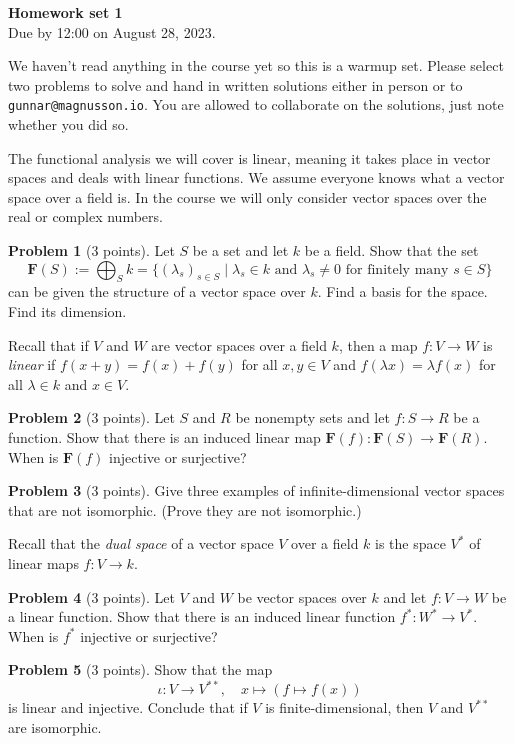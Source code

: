 \documentclass[11pt]{article}
\theoremstyle{definition}
\newtheorem{prob}{Problem}
\newcommand{\kk}[1]{\mathbf{#1}}
\def\head{
\begin{center}
\textbf{\LARGE Homework set 1}
\\[3pt]
Due by 12:00 on August 28, 2023.
\end{center}
\medskip
}
\begin{document}
\head

We haven't read anything in the course yet so this is a warmup set.
Please select two problems to solve and hand in written solutions either in person or to \verb+gunnar@magnusson.io+.
You are allowed to collaborate on the solutions, just note whether you did so.

The functional analysis we will cover is linear, meaning it takes place
in vector spaces and deals with linear functions.
We assume everyone knows what a vector space over a field is.
In the course we will only consider vector spaces over the real or complex numbers.


\begin{prob}[3 points]
Let $S$ be a set and let $k$ be a field.
Show that the set
\[
\kk F(S) :=
\bigoplus_{S} k
= \{ (\lambda_s)_{s \in S} \mid
\text{$\lambda_s \in k$ and $\lambda_s \not= 0$ for finitely many $s \in S$} \}
\]
can be given the structure of a vector space over $k$.
Find a basis for the space.
Find its dimension.
\end{prob}

Recall that if $V$ and $W$ are vector spaces over a field $k$, then a map
$f : V \to W$ is \emph{linear} if $f(x + y) = f(x) + f(y)$ for all $x, y \in V$
and $f(\lambda x) = \lambda f(x)$ for all $\lambda \in k$ and $x \in V$.

\begin{prob}[3 points]
Let $S$ and $R$ be nonempty sets and let $f : S \to R$ be a function.
Show that there is an induced linear map $\kk F(f) : \kk F(S) \to \kk F(R)$.
When is $\kk F(f)$ injective or surjective?
\end{prob}


\begin{prob}[3 points]
Give three examples of infinite-dimensional vector spaces that are not isomorphic.
(Prove they are not isomorphic.)
\end{prob}

Recall that the \emph{dual space} of a vector space $V$ over a field $k$ is the
space $V^*$ of linear maps $f : V \to k$.

\begin{prob}[3 points]
Let $V$ and $W$ be vector spaces over $k$ and let $f : V \to W$ be a linear function.
Show that there is an induced linear function $f^* : W^* \to V^*$.
When is $f^*$ injective or surjective?
\end{prob}

\begin{prob}[3 points]
Show that the map
\[
\iota : V \to V^{**},
\quad
x \mapsto (f \mapsto f(x))
\]
is linear and injective.
Conclude that if $V$ is finite-dimensional, then $V$ and $V^{**}$ are isomorphic.
\end{prob}
\end{document}
